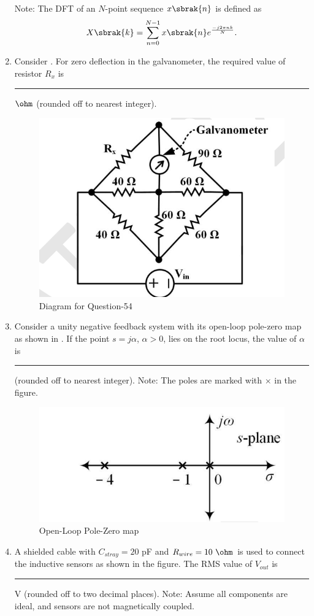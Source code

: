 \documentclass[journal,12pt,onecolumn]{IEEEtran}
\theoremstyle{remark}
\begin{document}
\begin{enumerate}
Note: The DFT of an $N$-point sequence $x\sbrak{n}$ is defined as 
$$
X\sbrak{k} = \sum_{n=0}^{N-1} x\sbrak{n} e^{\frac{-j 2\pi n k}{N}}.
$$
\par\hfill{}

\item Consider . For zero deflection in the galvanometer, the required value of resistor $R_x$ is \rule{1.5cm}{0.4pt} $\ohm$ (rounded off to nearest integer).
\par\hfill{}
\begin{figure}[H]
    \centering
    \includegraphics[width=0.4\columnwidth]{Figs/Q-54.png}
    \caption{Diagram for Question-54}
    \label{54}
\end{figure}

\item Consider a unity negative feedback system with its open-loop pole-zero map as shown in . If the point $s = j \alpha$, $\alpha >0$, lies on the root locus, the value of $\alpha$ is \rule{1.5cm}{0.4pt} (rounded off to nearest integer). Note: The poles are marked with $\times$ in the figure.
\par\hfill{}
\begin{figure}[H]
    \centering
    \includegraphics[width=0.4\columnwidth]{Figs/Q-55.png}
    \caption{Open-Loop Pole-Zero map}
    \label{55}
\end{figure}

\item A shielded cable with $C_{stray} = 20$ pF and $R_{wire} = 10~\ohm$ is used to connect the inductive sensors as shown in the figure. The RMS value of $V_{out}$ is \rule{1.5cm}{0.4pt} V (rounded off to two decimal places). Note: Assume all components are ideal, and sensors are not magnetically coupled.
\par\hfill{}


\end{enumerate}
\end{document}
